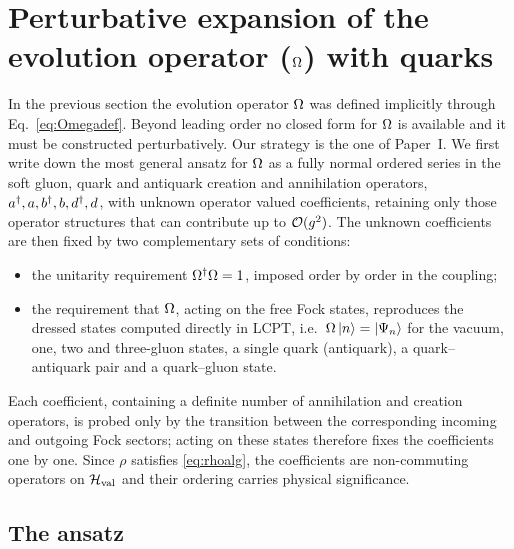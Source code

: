 \section{Perturbative expansion of the evolution operator ($\Omega$) with quarks}
\label{sec:omega}

In the previous section the evolution operator $\Omega$ was defined implicitly through
Eq.~\eqref{eq:Omegadef}. Beyond leading order no closed form for $\Omega$ is available and it must
be constructed perturbatively. Our strategy is the one of Paper~I. We first write down the most
general ansatz for $\Omega$ as a fully normal ordered series in the soft gluon, quark and antiquark
creation and annihilation operators, $a^{\dagger},a,b^{\dagger},b,d^{\dagger},d$, with unknown operator valued
coefficients, retaining only those operator structures that can contribute up to $\mathcal{O}(g^{2})$.
The unknown coefficients are then fixed by two complementary sets of conditions:
\begin{itemize}
\item the unitarity requirement $\Omega^{\dagger}\Omega=1$, imposed order by order in the coupling;
\item the requirement that $\Omega$, acting on the free Fock states, reproduces the dressed states
computed directly in LCPT, i.e.\ $\Omega\left|n\right\rangle=\left|\Psi_{n}\right\rangle$ for the vacuum, one, two and
three-gluon states, a single quark (antiquark), a quark--antiquark pair and a quark--gluon state.
\end{itemize}
Each coefficient, containing a definite number of annihilation and creation operators, is probed
only by the transition between the corresponding incoming and outgoing Fock sectors; acting on
these states therefore fixes the coefficients one by one. Since $\rho$ satisfies
\eqref{eq:rhoalg}, the coefficients are non-commuting operators on $\mathcal H_{\rm val}$ and
their ordering carries physical significance.

\subsection*{The ansatz}
\label{sec:ansatz}

